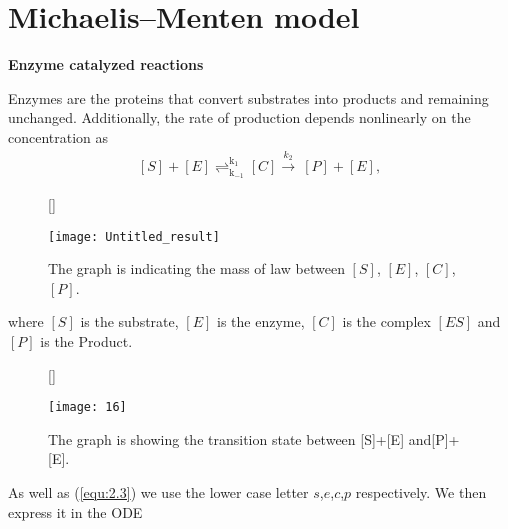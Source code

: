 \documentclass[a4paper]{report}
\theoremstyle{definition}
\begin{document}
\section{Michaelis–Menten model}
\textbf{Enzyme catalyzed reactions}

Enzymes are the proteins that convert substrates into products and remaining unchanged. Additionally, the rate of production depends nonlinearly on the concentration as
\begin{align}
\label{equ:6.1}
[S]+[E] \mathrel{\mathop{\rightleftharpoons}^{\mathrm{k_1}}_{\mathrm{k_{-1}}}} [C]\overset{k_2}{\longrightarrow}\ [P]+[E],
\end{align}
\begin{figure}[H]
[\FBwidth]
{\caption{The graph is indicating the mass of law between  $[S]$, $[E]$, $[C]$, $[P]$.}\label{fig:t}}
{\texttt{[image: Untitled\_result]}}
\end{figure}

where $[S]$ is the substrate, $[E]$ is the enzyme, $[C]$ is the complex $[ES]$ and $[P]$ is the Product. 
\begin{figure}[H]
[\FBwidth]
{\caption{The graph is showing the transition state between [S]+[E] and[P]+[E].}
\label{fig:t1}}
{\texttt{[image: 16]}}
\end{figure}

As well as (\ref{equ:2.3}) we use the lower case letter $s$,$e$,$c$,$p$ respectively.
We then express it in the ODE
\end{document}
